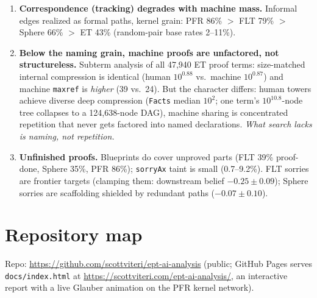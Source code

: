 \documentclass[11pt]{article}
\newcommand{\code}[1]{\texttt{#1}}
\begin{document}
\begin{enumerate}[leftmargin=1.4em, itemsep=2pt]
  only through fragile 1--2-consequence links and only when $\beta_{\mathrm{imp}}>
  \beta_{\mathrm{dep}}$; reuse hubs are refutation-proof (Lakatos, quantified).
\item \textbf{Correspondence (tracking) degrades with machine mass.} Informal edges realized
  as formal paths, kernel grain: PFR 86\% $>$ FLT 79\% $>$ Sphere 66\% $>$ ET 43\%
  (random-pair base rates 2--11\%).
\item \textbf{Below the naming grain, machine proofs are unfactored, not structureless.}
  Subterm analysis of all 47{,}940 ET proof terms: size-matched internal compression is
  identical (human $10^{0.88}$ vs.\ machine $10^{0.87}$) and machine \code{maxref} is
  \emph{higher} (39 vs.\ 24). But the character differs: human towers achieve diverse deep
  compression (\code{Facts} median $10^{2}$; one term's $10^{10.8}$-node tree collapses to a
  124{,}638-node DAG), machine sharing is concentrated repetition that never gets factored
  into named declarations. \emph{What search lacks is naming, not repetition.}
\item \textbf{Unfinished proofs.} Blueprints do cover unproved parts (FLT 39\% proof-done,
  Sphere 35\%, PFR 86\%); \code{sorryAx} taint is small (0.7--9.2\%). FLT sorries are
  frontier targets (clamping them: downstream belief $-0.25\pm0.09$); Sphere sorries are
  scaffolding shielded by redundant paths ($-0.07\pm0.10$).
\end{enumerate}

\section{Repository map}

Repo: \url{https://github.com/scottviteri/ept-ai-analysis} (public; GitHub Pages serves
\code{docs/index.html} at \url{https://scottviteri.com/ept-ai-analysis/}, an interactive
report with a live Glauber animation on the PFR kernel network).
\end{document}
